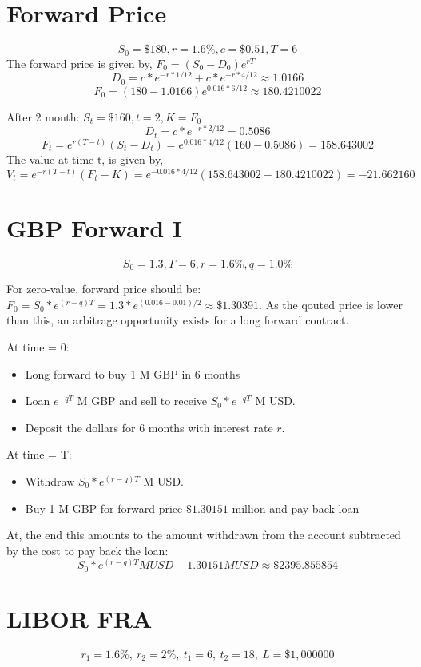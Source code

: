 \documentclass{article}
\begin{document}
\thispagestyle{fancy}


\section{Forward Price}

$$S_0 = \$180, r = 1.6\%, c = \$0.51, T = 6$$
The forward price is given by, $F_0 = (S_0 - D_0)e^{rT}$
$$D_0 = c*e^{-r * 1/12} + c*e^{-r * 4/12} \approx 1.0166 $$
$$F_0 = (180 - 1.0166)e^{0.016 * 6/12} \approx 180.4210022$$

After 2 month: $S_t = \$160, t=2, K=F_0$
$$D_t = c * e^{-r * 2/12} = 0.5086$$
$$F_t = e^{r(T-t)}(S_t - D_t) = e^{0.016 * 4/12}(160-0.5086) = 158.643002$$
The value at time t, is given by,
$$V_t = e^{-r(T-t)}(F_t - K) = e^{-0.016 * 4/12}(158.643002-180.4210022) = -21.662160$$

\section{GBP Forward I}

$$S_0 = 1.3, T=6, r = 1.6\%, q = 1.0\%$$

For zero-value, forward price should be: $F_0 = S_0*e^{(r-q)T} = 1.3 * e^{(0.016-0.01)/2} \approx \$1.30391 $. As the qouted price is lower than this, an arbitrage opportunity exists for a long forward contract.

At time = 0: 
\begin{itemize}
	\item Long forward to buy 1 M GBP in 6 months
	\item Loan $e^{-qT}$ M GBP and sell to receive $S_0*e^{-qT}$ M USD.
	\item Deposit the dollars for 6 months with interest rate $r$.
\end{itemize}

At time = T: 
\begin{itemize}
	\item Withdraw $S_0 * e^{(r-q)T}$ M USD.
	\item Buy 1 M GBP for forward price $\$1.30151$ million and pay back loan
\end{itemize}
At, the end this amounts to the amount withdrawn from the account subtracted by the cost to pay back the loan:
$$ S_0 * e^{(r-q)T} MUSD - 1.30151 MUSD \approx \$2395.855854$$


\section{LIBOR FRA}
$$r_1 = 1.6\%, \ r_2 = 2\%, \ t_1 = 6, \ t_2 = 18, \ L = \$1,000000$$
\end{document}
